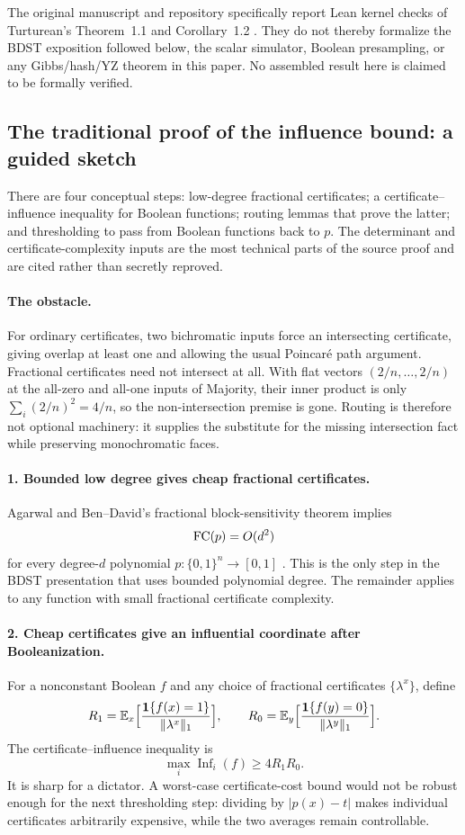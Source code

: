 \documentclass[11pt]{article}
\theoremstyle{definition}\newtheorem{definition}[theorem]{Definition}
\theoremstyle{remark}\newtheorem{remark}[theorem]{Remark}
\newcommand{\E}{\mathbb E}\newcommand{\Prb}{\mathbb P}
\DeclareMathOperator{\Inf}{Inf}\DeclareMathOperator{\Var}{Var}
\begin{document}
The original manuscript and repository specifically report Lean kernel checks of Turturean's Theorem~1.1 and Corollary~1.2 \cite{Tur26}. They do not thereby formalize the BDST exposition followed below, the scalar simulator, Boolean presampling, or any Gibbs/hash/YZ theorem in this paper. No assembled result here is claimed to be formally verified.

\subsection{The traditional proof of the influence bound: a guided sketch}\label{sec:aa-sketch}
There are four conceptual steps: low-degree fractional certificates; a certificate--influence inequality for Boolean functions; routing lemmas that prove the latter; and thresholding to pass from Boolean functions back to \(p\). The determinant and certificate-complexity inputs are the most technical parts of the source proof and are cited rather than secretly reproved.

\paragraph{The obstacle.}
For ordinary certificates, two bichromatic inputs force an intersecting certificate, giving overlap at least one and allowing the usual Poincaré path argument. Fractional certificates need not intersect at all. With flat vectors \((2/n,\ldots,2/n)\) at the all-zero and all-one inputs of Majority, their inner product is only \(\sum_i(2/n)^2=4/n\), so the non-intersection premise is gone. Routing is therefore not optional machinery: it supplies the substitute for the missing intersection fact while preserving monochromatic faces.

\paragraph{1. Bounded low degree gives cheap fractional certificates.}
Agarwal and Ben--David's fractional block-sensitivity theorem implies
\[
 \operatorname{FC}(p)=O(d^2)
\]
for every degree-\(d\) polynomial \(p:\{0,1\}^n\to[0,1]\) \cite[Fact~2.4 and the cited ABD result]{BDST26}. This is the only step in the BDST presentation that uses bounded polynomial degree. The remainder applies to any function with small fractional certificate complexity.

\paragraph{2. Cheap certificates give an influential coordinate after Booleanization.}
For a nonconstant Boolean \(f\) and any choice of fractional certificates \(\{\lambda^x\}\), define
\[
 R_1=\E_x\Bigl[\frac{\mathbf 1\{f(x)=1\}}{\|\lambda^x\|_1}\Bigr],\qquad
 R_0=\E_y\Bigl[\frac{\mathbf 1\{f(y)=0\}}{\|\lambda^y\|_1}\Bigr].
\]
The certificate--influence inequality \cite[Lemma~2.5]{BDST26} is
\[
 \max_i\Inf_i(f)\ge4R_1R_0.
\]
It is sharp for a dictator. A worst-case certificate-cost bound would not be robust enough for the next thresholding step: dividing by \(|p(x)-t|\) makes individual certificates arbitrarily expensive, while the two averages remain controllable.
\end{document}
